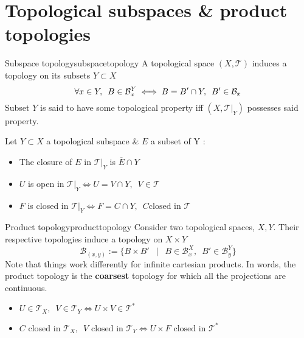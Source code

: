 \section{Topological subspaces \& product topologies}\label{sec:subtopprodtop}
\begin{mydef}{Subspace topology}{subspacetopology}
	A topological space $(X, \mathcal{T})$ induces a topology on its subsets $Y \subset X$
	$$\forall x \in Y, \enskip B \in \mathcal{B}_x^Y \iff B =B' \cap Y, \enspace B' \in \mathcal{B}_x$$
	Subset $Y$ is said to have some topological property iff $(X, \mathcal{T}\big|_Y )$ possesses said property.
\end{mydef}
\begin{myprop}{}{}
	Let $Y \subset X$ a topological subspace \& $E$ a subset of Y :
	\begin{itemize}
		\item The closure of $E$ in $\mathcal{T}\big|_Y$ is $\overline{E} \cap Y$
		\item $U$ is open in $\mathcal{T}\big|_Y \iff U = V \cap Y, \enspace V \in \mathcal{T}$ 
		\item $F$ is closed in $\mathcal{T}\big|_Y \iff F = C \cap Y, \enspace C \textrm{closed in } \mathcal{T}$
	\end{itemize}
\end{myprop}

\begin{mydef}{Product topology}{producttopology}
	Consider two topological spaces, $X, Y$. Their respective topologies induce a topology on $X \times Y$
	$$\mathcal{B}_{(x, y)} :=  \{B\times B' \enspace \mid \enspace B \in \mathcal{B}_x^X,  \enspace B' \in \mathcal{B}_y^Y\}$$
	Note that things work differently for infinite cartesian products. In words, the product topology is the \textbf{coarsest} topology for which all the projections are continuous.
\end{mydef}

\begin{myprop}{}{}
	\begin{itemize}
		\item $U \in \mathcal{T}_X, \enspace V \in  \mathcal{T}_Y \iff U \times V \in \mathcal{T}^*$ 
		\item $C \textrm{ closed in } \mathcal{T}_X, \enspace V \textrm{ closed in }  \mathcal{T}_Y \iff U \times F \textrm{ closed in } \mathcal{T}^*$ 
	\end{itemize}
\end{myprop}

\pagebreak
